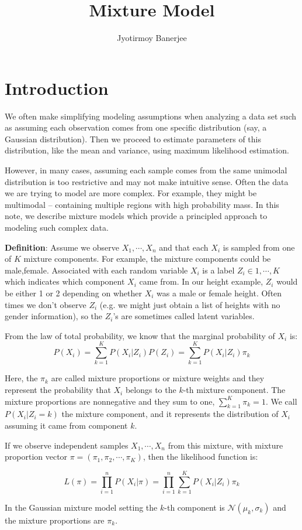 \documentclass{article}
\title{Mixture Model}
\author{Jyotirmoy Banerjee}
\begin{document}
\maketitle


\section{Introduction}
We often make simplifying modeling assumptions when analyzing a data set such as assuming each observation comes from one specific distribution (say, a Gaussian distribution). Then we proceed to estimate parameters of this distribution, like the mean and variance, using maximum likelihood estimation.

However, in many cases, assuming each sample comes from the same unimodal distribution is too restrictive and may not make intuitive sense. Often the data we are trying to model are more complex. For example, they might be multimodal – containing multiple regions with high probability mass. In this note, we describe mixture models which provide a principled approach to modeling such complex data.


\textbf{Definition}:
Assume we observe $X_1,\cdots,X_n$ and that each $X_i$ is sampled from one of $K$ mixture components. For example, the mixture components could be {male,female}. Associated with each random variable $X_i$ is a label $Z_i \in {1,\cdots,K}$ which indicates which component $X_i$ came from. In our height example, $Z_i$ would be either 1 or 2 depending on whether $X_i$ was a male or female height. Often times we don’t observe $Z_i$ (e.g. we might just obtain a list of heights with no gender information), so the $Z_i$'s are sometimes called latent variables.

From the law of total probability, we know that the marginal probability of $X_i$ is:
\[ P(X_i) = \sum_{k=1}^{K} P(X_i | Z_i) P(Z_i) = \sum_{k=1}^{K} P(X_i | Z_i) \pi_k \]

Here, the $\pi_k$ are called mixture proportions or mixture weights and they represent the probability that $X_i$ belongs to the $k$-th mixture component. The mixture proportions are nonnegative and they sum to one, $\sum_{k=1}^{K} \pi_k = 1$. We call $P(X_i|Z_i=k)$ the mixture component, and it represents the distribution of $X_i$ assuming it came from component $k$.

If we observe independent samples $X_1,\cdots,X_n$ from this mixture, with mixture proportion vector $\pi=(\pi_1,\pi_2,\cdots,\pi_K)$, then the likelihood function is:

\[
L(\pi) = \prod_{i=1}^{n} P(X_i | \pi) = \prod_{i=1}^{n} \sum_{k=1}^{K} P(X_i | Z_i) \pi_k
\]

In the Gaussian mixture model setting the $k$-th component is $\mathcal{N}(\mu_k,\sigma_k)$ and the mixture proportions are $\pi_k$.
\end{document}
